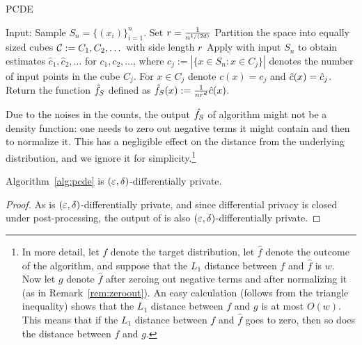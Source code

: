 \documentclass[12pt,a4paper,oneside,onecolumn]{book}
\begin{document}
\begin{algorithm}
  \caption{PCDE}\label{alg:pcde}
  \begin{algorithmic}[1]
    \State Input: Sample $S_n = \{(x_i)\}_{i=1}^n$.
    \State Set $r=\frac{1}{n^{1/(2d)}}$ 
    \State Partition the space into equally sized cubes $\mathcal{C} := C_1,C_2,\dots$ with side length $r$
    \State Apply  with input $S_n$ to obtain estimates $\hat{c}_1,\hat{c}_2,\dots$ for $c_1,c_2,\dots$, where $c_j:=|\{x\in S_n : x\in C_j\}|$ denotes the number of input points in the cube $C_j$.
    \State For $x\in C_j$ denote $c(x)=c_j$ and $\hat{c}(x)=\hat{c}_j$.
    \State Return the function $\hat{f}_S$ defined as $\hat{f}_S(x):= \frac{1}{n r^d}\hat{c}(x)$.
  \end{algorithmic}
\end{algorithm}

\begin{remark}\label{rem:zeroout}
Due to the noises in the counts, the output $\hat{f_S}$ of algorithm  might not be a density function: one needs to zero out negative terms it might contain and then to normalize it. This has a negligible effect on the distance from the underlying distribution, and we ignore it for simplicity.\footnote{In more detail, let $f$ denote the target distribution, let $\hat{f}$ denote the outcome of the algorithm, and suppose that the $L_1$ distance between $f$ and $\hat{f}$ is $w$. Now let $g$ denote $\hat{f}$ after zeroing out negative terms and after normalizing it (as in Remark~\ref{rem:zeroout}). An easy calculation (follows from the triangle inequality) shows that the $L_1$ distance between $f$ and $g$ is at most $O(w)$. This means that if the $L_1$ distance between $f$ and $\hat{f}$ goes to zero, then so does the distance between $f$ and $g$.}
\end{remark}



\label{sec:privacy}
\begin{theorem}
Algorithm~\ref{alg:pcde} is $(\varepsilon,\delta)$-differentially private.
\end{theorem}

\begin{proof}
As  is $(\varepsilon,\delta)$-differentially private, 
and since differential privacy is closed under post-processing, the output of  is also $(\varepsilon,\delta)$-differentially private.
\end{proof}
\end{document}
